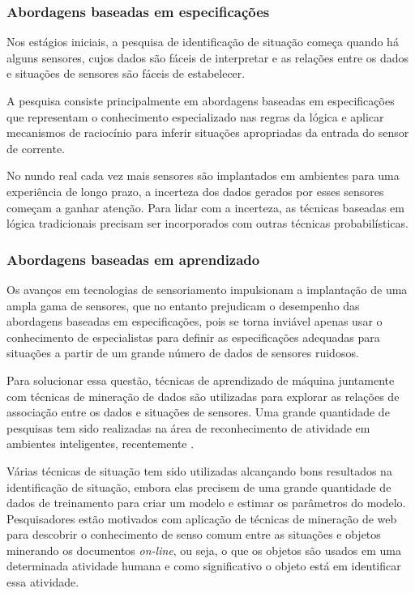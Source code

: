 \documentclass[12pt,a4paper,compsoc]{IEEEtran}
\begin{document}
\subsubsection{Abordagens baseadas em especificações}

  Nos estágios iniciais, a pesquisa de identificação de situação começa quando há alguns sensores,
  cujos dados são fáceis de interpretar e as relações entre os dados e situações de sensores são 
  fáceis de estabelecer.
  
  A pesquisa consiste principalmente em abordagens baseadas em especificações que representam o
  conhecimento especializado nas regras da lógica e aplicar mecanismos de raciocínio para inferir
  situações apropriadas da entrada do sensor de corrente.
  
  No nundo real cada vez mais sensores são implantados em ambientes para uma experiência de longo
  prazo, a incerteza dos dados gerados por esses sensores começam a ganhar atenção. Para lidar com
  a incerteza, as técnicas baseadas em lógica tradicionais precisam ser incorporados com outras
  técnicas probabilísticas.
  

\subsubsection{Abordagens baseadas em aprendizado}

  Os avanços em tecnologias de sensoriamento impulsionam a implantação de uma ampla gama de
  sensores, que no entanto prejudicam o desempenho das abordagens baseadas em especificações, pois
  se torna inviável apenas usar o conhecimento de especialistas para definir as especificações
  adequadas para situações a partir de um grande número de dados de sensores ruidosos.
  
  Para solucionar essa questão, técnicas de aprendizado de máquina juntamente com técnicas de
  mineração de dados são utilizadas para explorar as relações de associação entre os dados e 
  situações de sensores. Uma grande quantidade de pesquisas tem sido realizadas na área de
  reconhecimento de atividade em ambientes inteligentes, recentemente \cite{knappmeyer2012survey}.
  
  Várias técnicas de situação tem sido utilizadas alcançando bons resultados na identificação de
  situação, embora elas precisem de uma grande quantidade de dados de treinamento para criar um
  modelo e estimar os parâmetros do modelo. Pesquisadores estão motivados com aplicação de técnicas
  de mineração de web para descobrir o conhecimento de senso comum entre as situações e objetos
  minerando os documentos \textit{on-line}, ou seja, o que os objetos são usados em uma determinada 
  atividade humana e como significativo o objeto está em identificar essa atividade.
\end{document}
